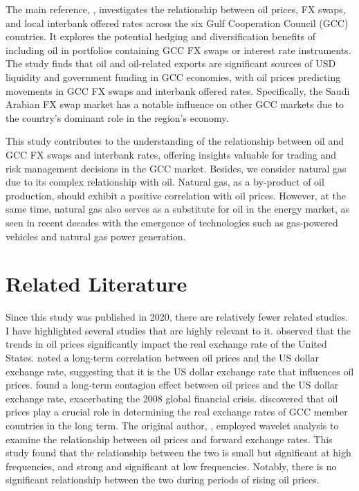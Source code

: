 \documentclass[12pt]{article}
\begin{document}
\begin{sloppypar}
The main reference, \textcite{almaskati2022oil}, investigates the relationship between oil prices, FX swaps, and local interbank offered rates across the six Gulf Cooperation Council (GCC) countries. It explores the potential hedging and diversification benefits of including oil in portfolios containing GCC FX swaps or interest rate instruments. The study finds that oil and oil-related exports are significant sources of USD liquidity and government funding in GCC economies, with oil prices predicting movements in GCC FX swaps and interbank offered rates. Specifically, the Saudi Arabian FX swap market has a notable influence on other GCC markets due to the country's dominant role in the region's economy.

This study contributes to the understanding of the relationship between oil and GCC FX swaps and interbank rates, offering insights valuable for trading and risk management decisions in the GCC market. Besides, we consider natural gas due to its complex relationship with oil. Natural gas, as a by-product of oil production, should exhibit a positive correlation with oil prices. However, at the same time, natural gas also serves as a substitute for oil in the energy market, as seen in recent decades with the emergence of technologies such as gas-powered vehicles and natural gas power generation.

\section{Related Literature}
Since this study was published in 2020, there are relatively fewer related studies. I have highlighted several studies that are highly relevant to it. \textcite{amano1998oil} observed that the trends in oil prices significantly impact the real exchange rate of the United States. \textcite{zhang2008spillover} noted a long-term correlation between oil prices and the US dollar exchange rate, suggesting that it is the US dollar exchange rate that influences oil prices. \textcite{reboredo2014oil} found a long-term contagion effect between oil prices and the US dollar exchange rate, exacerbating the 2008 global financial crisis. \textcite{eslamloueyan2015determinants} discovered that oil prices play a crucial role in determining the real exchange rates of GCC member countries in the long term. The original author, \textcite{almaskati2022wavelet}, employed wavelet analysis to examine the relationship between oil prices and forward exchange rates. This study found that the relationship between the two is small but significant at high frequencies, and strong and significant at low frequencies. Notably, there is no significant relationship between the two during periods of rising oil prices.


\end{sloppypar}
\end{document}
